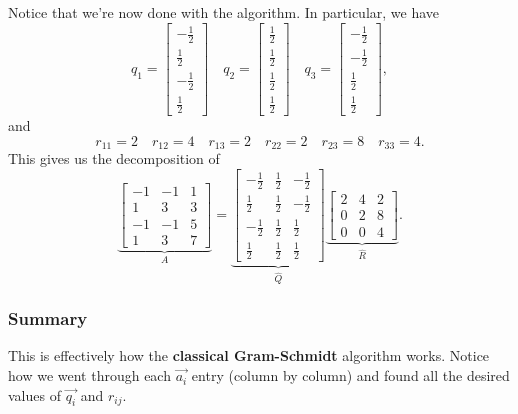 \documentclass[letterpaper]{article}
\newcommand{\0}{\mathbf{0}}
\begin{document}
\begin{mdframed}
    Notice that we're now done with the algorithm. In particular, we have 
    \[q_1 = \begin{bmatrix}
        -\frac{1}{2} \\ \frac{1}{2} \\ -\frac{1}{2} \\ \frac{1}{2}
    \end{bmatrix} \quad q_2 = \begin{bmatrix}
        \frac{1}{2} \\ \frac{1}{2} \\ \frac{1}{2} \\ \frac{1}{2}
    \end{bmatrix} \quad q_3 = \begin{bmatrix}
        -\frac{1}{2} \\ -\frac{1}{2} \\ \frac{1}{2} \\ \frac{1}{2}
    \end{bmatrix},\]
    and 
    \[r_{11} = 2 \quad r_{12} = 4 \quad r_{13} = 2 \quad r_{22} = 2 \quad r_{23} = 8 \quad r_{33} = 4.\]
    This gives us the decomposition of 
    \[\underbrace{\begin{bmatrix}
        -1 & -1 & 1 \\ 
        1 & 3 & 3 \\ 
        -1 & -1 & 5 \\ 
        1 & 3 & 7
    \end{bmatrix}}_{A} = \underbrace{\begin{bmatrix}
        -\frac{1}{2} & \frac{1}{2} & -\frac{1}{2} \\ 
        \frac{1}{2} & \frac{1}{2} & -\frac{1}{2} \\ 
        -\frac{1}{2} & \frac{1}{2} & \frac{1}{2} \\ 
        \frac{1}{2} & \frac{1}{2} & \frac{1}{2}
    \end{bmatrix}}_{\hat{Q}} \underbrace{\begin{bmatrix}
        2 & 4 & 2 \\ 
        0 & 2 & 8 \\ 
        0 & 0 & 4
    \end{bmatrix}}_{\hat{R}}.\]
\end{mdframed}

\subsubsection{Summary}
This is effectively how the \textbf{classical Gram-Schmidt} algorithm works. Notice how we went through each $\vec{a_i}$ entry (column by column) and found all the desired values of $\vec{q_i}$ and $r_{ij}$. 
\end{document}
